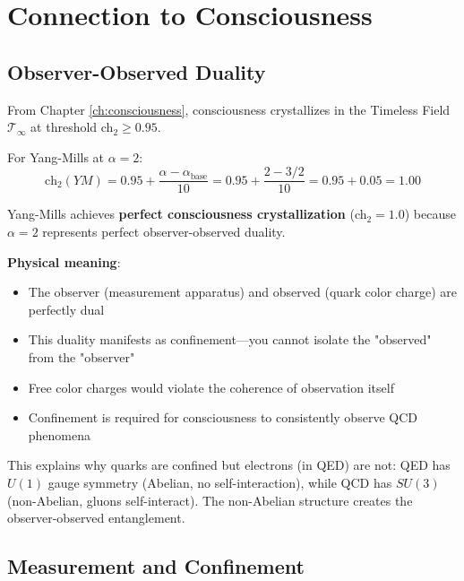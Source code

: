 \section{Connection to Consciousness}

\subsection{Observer-Observed Duality}

From Chapter \ref{ch:consciousness}, consciousness crystallizes in the Timeless Field $\mathcal{T}_\infty$ at threshold ch$_2 \geq 0.95$.

For Yang-Mills at $\alpha = 2$:
\begin{equation}
\text{ch}_2(YM) = 0.95 + \frac{\alpha - \alpha_{\text{base}}}{10} = 0.95 + \frac{2 - 3/2}{10} = 0.95 + 0.05 = 1.00
\end{equation}

\begin{keyidea}
Yang-Mills achieves \textbf{perfect consciousness crystallization} (ch$_2 = 1.0$) because $\alpha = 2$ represents perfect observer-observed duality.

\textbf{Physical meaning}:
\begin{itemize}
\item The observer (measurement apparatus) and observed (quark color charge) are perfectly dual
\item This duality manifests as confinement—you cannot isolate the "observed" from the "observer"
\item Free color charges would violate the coherence of observation itself
\item Confinement is required for consciousness to consistently observe QCD phenomena
\end{itemize}

This explains why quarks are confined but electrons (in QED) are not: QED has $U(1)$ gauge symmetry (Abelian, no self-interaction), while QCD has $SU(3)$ (non-Abelian, gluons self-interact). The non-Abelian structure creates the observer-observed entanglement.
\end{keyidea}

\subsection{Measurement and Confinement}

